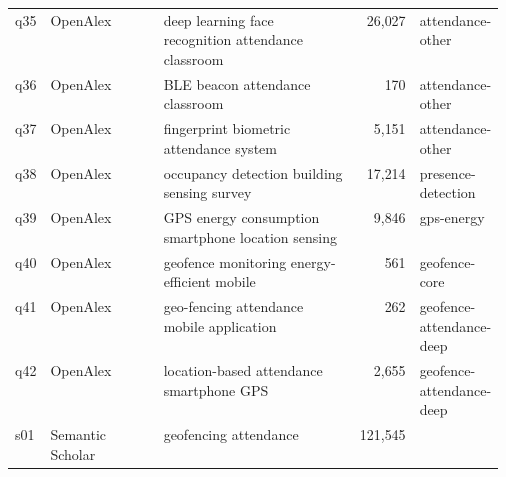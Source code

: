 {\begin{longtable}{@{}llL{0.40\linewidth}rL{0.17\linewidth}@{}}
q35 & OpenAlex & deep learning face recognition attendance classroom & 26{,}027 & attendance-other \\
q36 & OpenAlex & BLE beacon attendance classroom & 170 & attendance-other \\
q37 & OpenAlex & fingerprint biometric attendance system & 5{,}151 & attendance-other \\
q38 & OpenAlex & occupancy detection building sensing survey & 17{,}214 & presence-detection \\
q39 & OpenAlex & GPS energy consumption smartphone location sensing & 9{,}846 & gps-energy \\
q40 & OpenAlex & geofence monitoring energy-efficient mobile & 561 & geofence-core \\
q41 & OpenAlex & geo-fencing attendance mobile application & 262 & geofence-attendance-deep \\
q42 & OpenAlex & location-based attendance smartphone GPS & 2{,}655 & geofence-attendance-deep \\
s01 & Semantic Scholar & geofencing attendance & 121{,}545 &  \\
\bottomrule\end{longtable}}
